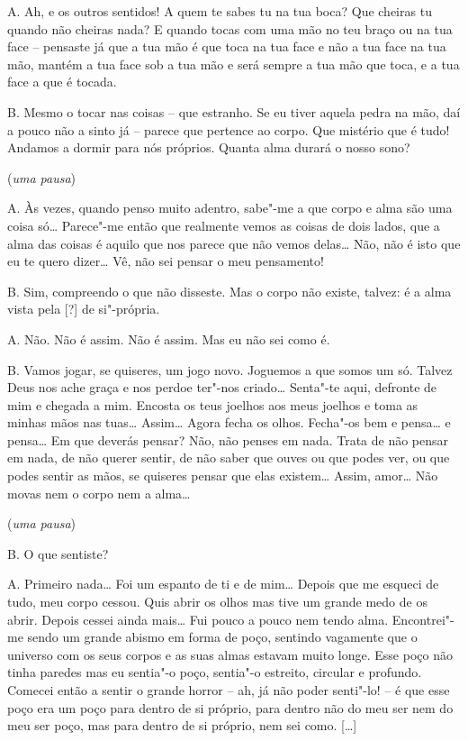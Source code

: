\textsc{A.} Ah, e os outros sentidos! A quem te sabes tu na tua boca? Que
cheiras tu quando não cheiras nada? E quando tocas com uma mão no teu
braço ou na tua face -- pensaste já que a tua mão é que toca na tua
face e não a tua face na tua mão, mantém a tua face sob a tua mão e
será sempre a tua mão que toca, e a tua face a que é tocada.

\textsc{B.} Mesmo o tocar nas coisas -- que estranho. Se eu tiver aquela pedra
na mão, daí a pouco não a sinto já -- parece que pertence ao corpo.
Que mistério que é tudo! Andamos a dormir para nós próprios. Quanta
alma durará o nosso sono?

\hfill(\textit{uma pausa}) 

\textsc{A.} Às vezes, quando penso muito adentro, sabe"-me a que corpo e alma
são uma coisa só\ldots{} Parece"-me então que realmente vemos as coisas de
dois lados, que a alma das coisas é aquilo que nos parece que não
vemos delas\ldots{} Não, não é isto que eu te quero dizer\ldots{} Vê, não sei
pensar o meu pensamento!

\textsc{B.} Sim, compreendo o que não disseste. Mas o corpo não existe, talvez:
é a alma vista pela [?] de si"-própria.

\textsc{A.} Não. Não é assim. Não é assim. Mas eu não sei como é.

\textsc{B.} Vamos jogar, se quiseres, um jogo novo. Joguemos a que somos um só.
Talvez Deus nos ache graça e nos perdoe ter"-nos criado\ldots{} Senta"-te
aqui, defronte de mim e chegada a mim. Encosta os teus joelhos aos
meus joelhos e toma as minhas mãos nas tuas\ldots{} Assim\ldots{} Agora fecha
os olhos. Fecha"-os bem e pensa\ldots{} e pensa\ldots{} Em que deverás pensar?
Não, não penses em nada. Trata de não pensar em nada, de não querer
sentir, de não saber que ouves ou que podes ver, ou que podes sentir
as mãos, se quiseres pensar que elas existem\ldots{} Assim, amor\ldots{} Não
movas nem o corpo nem a alma\ldots{}

\hfill(\textit{uma pausa}) 

\textsc{B.} O que sentiste?

\textsc{A.} Primeiro nada\ldots{} Foi um espanto de ti e de mim\ldots{} Depois que me
esqueci de tudo, meu corpo cessou. Quis abrir os olhos mas tive um
grande medo de os abrir. Depois cessei ainda mais\ldots{} Fui pouco a
pouco nem tendo alma. Encontrei"-me sendo um grande abismo em forma de
poço, sentindo vagamente que o universo com os seus corpos e as suas
almas estavam muito longe. Esse poço não tinha paredes mas eu
sentia"-o poço, sentia"-o estreito, circular e profundo. Comecei então
a sentir o grande horror -- ah, já não poder senti"-lo! -- é que esse
poço era um poço para dentro de si próprio, para dentro não do meu
ser nem do meu ser poço, mas para dentro de si próprio, nem sei como.
[\ldots{}] 

